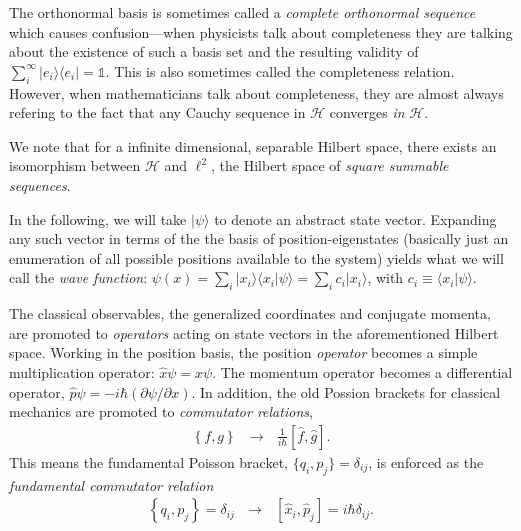 \documentclass[../../master.tex]{subfiles}
\begin{document}
\begin{exframe}
The orthonormal basis is sometimes called a \emph{complete orthonormal sequence} \cite{rynne} which causes confusion\----when physicists talk about completeness they are talking about the existence of such a basis set and the resulting validity of $\sum_i^\infty |e_i\rangle\langle e_i|=\mathds{1}$. This is also sometimes called the completeness relation. However, when mathematicians talk about completeness, they are almost always refering to the fact that any Cauchy sequence in $\mathcal{H}$ converges \emph{in} $\mathcal{H}$.

We note that for a infinite dimensional, separable Hilbert space, there exists an isomorphism between $\mathcal H$ and $\ell^2$, the Hilbert space of \emph{square summable sequences}. 

In the following, we will take $|\psi\rangle$ to denote an abstract state vector. Expanding any such vector in terms of the the basis of position-eigenstates (basically just an enumeration of all possible positions available to the system) yields what we will call the \emph{wave function}: $\psi(x)=\sum_i|x_i\rangle  \langle x_i | \psi \rangle = \sum_i c_i |x_i\rangle$, with $c_i\equiv \langle x_i|\psi\rangle$.
\end{exframe}

The classical observables, the generalized coordinates and conjugate momenta, are promoted to \emph{operators} acting on state vectors in the aforementioned Hilbert space. Working in the position basis, the position \emph{operator} becomes a simple multiplication operator: $\hat x \psi = x\psi$. The momentum operator becomes a differential operator, $\hat p \psi= -i\hbar (\partial \psi / \partial  x)$. In addition, the old Possion brackets for classical mechanics are promoted to \emph{commutator relations},
\begin{align}
\left\{ f, g \right\} \ \ \  \rightarrow \ \ \  \frac{1}{i \hbar }\left[ \hat f, \hat g \right].
\end{align}
This means the fundamental Poisson bracket, $\{q_i,p_j\}=\delta_{ij}$, is enforced as the \emph{fundamental commutator relation}
\begin{align}
\left\{ q_i, p_j \right\}=\delta_{ij} \ \ \ \rightarrow \ \ \ \left[ \hat x_i, \hat p_j \right] = i\hbar \delta_{ij}.
\end{align}
\end{document}
